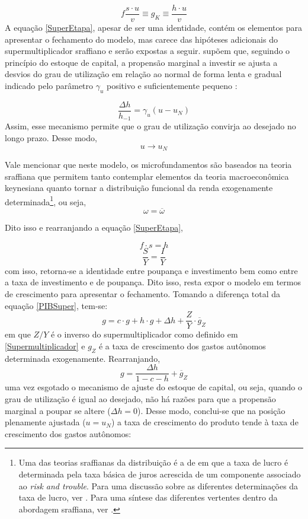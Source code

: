 \begin{equation}
\label{SuperEtapa}
f\frac{s\cdot u}{v} \equiv g_K \equiv \frac{h\cdot u}{v}    
\end{equation}
A equação \ref{SuperEtapa}, apesar de ser uma identidade, contém os elementos para apresentar o fechamento do modelo, mas carece das hipóteses adicionais do supermultiplicador sraffiano e serão expostas a seguir. \textcite{freitas_growth_2015} supõem que, seguindo o princípio do estoque de capital, a propensão marginal a investir se ajusta a desvios do grau de utilização em relação ao normal de forma lenta e gradual indicado pelo parâmetro $\gamma_u$ positivo e suficientemente pequeno \cite[p.~271]{freitas_growth_2015}:

$$
\frac{\Delta h}{h_{-1}} = \gamma_u (u - u_N)
$$
Assim, esse mecanismo permite que o grau de utilização convirja ao desejado no longo prazo. Desse modo,
$$
u \to u_N
$$

Vale mencionar que neste modelo, os microfundamentos são baseados na teoria sraffiana que permitem tanto contemplar elementos da teoria macroeconômica keynesiana quanto tornar a distribuição funcional da renda exogenamente determinada\footnote{
	Uma das teorias sraffianas da distribuição é a de \textcite{pivetti_essay_1992} em que a taxa de lucro é determinada pela taxa básica de juros acrescida de um componente associado ao \textit{risk and trouble}.
	Para uma discussão sobre as diferentes determinações da taxa de lucro, ver \textcite{serrano_teoria_1988}.
	Para uma síntese das diferentes vertentes dentro da abordagem sraffiana, ver \textcite{aspromourgos_sraffian_2004}.
}, ou seja,
$$
\omega = \overline \omega
$$

Dito isso e rearranjando a equação \ref{SuperEtapa}, 


$$
f\cdot s = h
$$
$$
\frac{S}{Y} = \frac{I}{Y}
$$
com isso, retorna-se a identidade entre poupança e investimento bem como entre a taxa de investimento e de poupança. 
Dito isso, resta expor o modelo em termos de crescimento para apresentar o fechamento.
Tomando a diferença total da equação \ref{PIBSuper}, tem-se:
$$
g = c\cdot g + h\cdot g + \Delta h + \frac{Z}{Y}\cdot \overline g_Z
$$
em que $Z/Y$ é o inverso do supermultiplicador como definido em \ref{Supermultiplicador} e $g_Z$ é a taxa de crescimento dos gastos autônomos determinada exogenamente. Rearranjando, 
\begin{equation}
\label{crescimentosuper}
g = \frac{\Delta h}{1 - c - h} + \overline g_Z
\end{equation}
uma vez esgotado o mecanismo de ajuste do estoque de capital, ou seja, quando o grau de utilização é igual ao desejado, não há razões para que a propensão marginal a poupar se altere ($\Delta h = 0$). Desse modo, conclui-se que na posição plenamente ajustada ($u = u_N$) a taxa de crescimento do produto tende à taxa de crescimento dos gastos autônomos:

